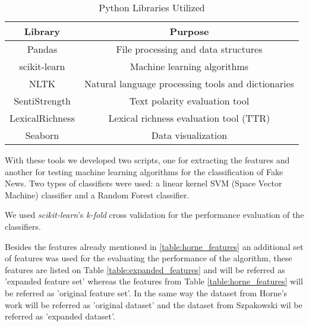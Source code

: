 \documentclass[conference]{IEEEtran}
\begin{document}
\begin{table}[htbp]
\caption{Python Libraries Utilized}
\begin{center}
\begin{tabular}{ |c|c| }
\hline
Library & Purpose \\ \hline
Pandas & File processing and data structures \\ \hline
scikit-learn & Machine learning algorithms \\ \hline
NLTK & Natural language processing tools and dictionaries \\ \hline
SentiStrength & Text polarity evaluation tool \\ \hline
LexicalRichness & Lexical richness evaluation tool (TTR) \\ \hline
Seaborn & Data visualization \\ \hline
\end{tabular}
\label{table:python_libs}
\end{center}
\end{table}

With these tools we developed two scripts, one for extracting the features and another for testing
machine learning algorithms for the classification of Fake News. Two types of classifiers were used:
a linear kernel SVM (Space Vector Machine) classifier and a Random Forest classifier.

We used \textit{scikit-learn}'s \textit{k-fold} cross validation for the performance evaluation of
the classifiers.

Besides the features already mentioned in \ref{table:horne_features} an additional set of features
was used for the evaluating the performance of the algorithm, these features are listed on Table
\ref{table:expanded_features} and will be referred as 'expanded feature set' whereas the features from
Table \ref{table:horne_features} will be referred as 'original feature set'. In the same way the dataset
from Horne's work \cite{horne_2017} will be referred as 'original dataset' and the dataset from Szpakowski
\cite{szpakowski_2019} wil be referred as 'expanded dataset'.
\end{document}
